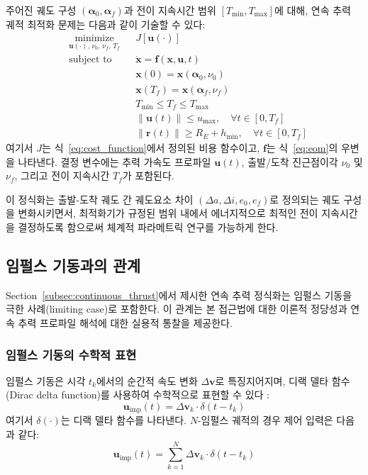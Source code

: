 \documentclass[a4paper,fleqn]{cas-dc}
\let\origsubsection\subsection
\renewcommand{\subsection}{\FloatBarrier\origsubsection}
\begin{document}
주어진 궤도 구성 $(\boldsymbol{\alpha}_0, \boldsymbol{\alpha}_f)$과 전이 지속시간 범위 $[T_{\min}, T_{\max}]$에 대해, 연속 추력 궤적 최적화 문제는 다음과 같이 기술할 수 있다:
\begin{equation}\label{eq:ocp}
\begin{aligned}
& \underset{\mathbf{u}(\cdot),\, \nu_0,\, \nu_f,\, T_f}{\text{minimize}} & & J[\mathbf{u}(\cdot)] \\
& \text{subject to} & & \dot{\mathbf{x}} = \mathbf{f}(\mathbf{x}, \mathbf{u}, t) \\
& & & \mathbf{x}(0) = \mathbf{x}(\boldsymbol{\alpha}_0, \nu_0) \\
& & & \mathbf{x}(T_f) = \mathbf{x}(\boldsymbol{\alpha}_f, \nu_f) \\
& & & T_{\min} \leq T_f \leq T_{\max} \\
& & & \|\mathbf{u}(t)\| \leq u_{\max}, \quad \forall t \in [0, T_f] \\
& & & \|\mathbf{r}(t)\| \geq R_E + h_{\min}, \quad \forall t \in [0, T_f]
\end{aligned}
\end{equation}
여기서 $J$는 식~\eqref{eq:cost_function}에서 정의된 비용 함수이고, $\mathbf{f}$는 식~\eqref{eq:eom}의 우변을 나타낸다. 결정 변수에는 추력 가속도 프로파일 $\mathbf{u}(t)$, 출발/도착 진근점이각 $\nu_0$ 및 $\nu_f$, 그리고 전이 지속시간 $T_f$가 포함된다.

이 정식화는 출발-도착 궤도 간 궤도요소 차이 $(\Delta a, \Delta i, e_0, e_f)$로 정의되는 궤도 구성을 변화시키면서, 최적화기가 규정된 범위 내에서 에너지적으로 최적인 전이 지속시간을 결정하도록 함으로써 체계적 파라메트릭 연구를 가능하게 한다.

\subsection{임펄스 기동과의 관계}\label{subsec:impulsive_relation}

Section~\ref{subsec:continuous_thrust}에서 제시한 연속 추력 정식화는 임펄스 기동을 극한 사례(limiting case)로 포함한다. 이 관계는 본 접근법에 대한 이론적 정당성과 연속 추력 프로파일 해석에 대한 실용적 통찰을 제공한다.

\subsubsection{임펄스 기동의 수학적 표현}

임펄스 기동은 시각 $t_k$에서의 순간적 속도 변화 $\Delta\mathbf{v}$로 특징지어지며, 디랙 델타 함수(Dirac delta function)를 사용하여 수학적으로 표현할 수 있다 \citep{Lawden1963}:
\begin{equation}\label{eq:impulse_delta}
\mathbf{u}_{\text{imp}}(t) = \Delta\mathbf{v}_k \cdot \delta(t - t_k)
\end{equation}
여기서 $\delta(\cdot)$는 디랙 델타 함수를 나타낸다. $N$-임펄스 궤적의 경우 제어 입력은 다음과 같다:
\begin{equation}\label{eq:n_impulse}
\mathbf{u}_{\text{imp}}(t) = \sum_{k=1}^{N} \Delta\mathbf{v}_k \cdot \delta(t - t_k)
\end{equation}
\end{document}
